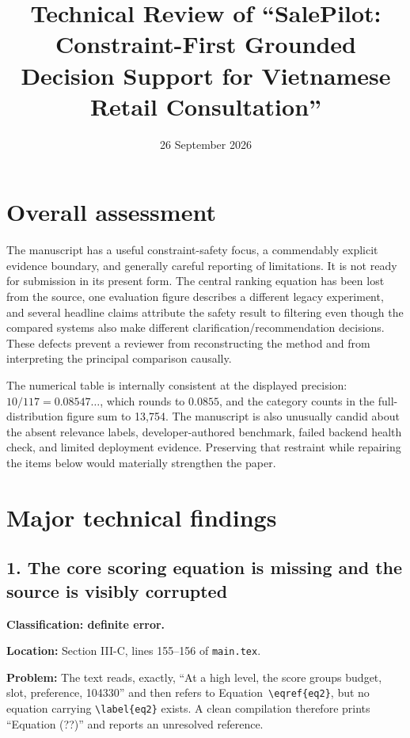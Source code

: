 \documentclass[11pt]{article}
\title{Technical Review of ``SalePilot: Constraint-First Grounded Decision Support for Vietnamese Retail Consultation''}
\author{}
\date{26 September 2026}
\begin{document}
\maketitle

\section*{Overall assessment}

The manuscript has a useful constraint-safety focus, a commendably explicit evidence boundary, and generally careful reporting of limitations.  It is not ready for submission in its present form.  The central ranking equation has been lost from the source, one evaluation figure describes a different legacy experiment, and several headline claims attribute the safety result to filtering even though the compared systems also make different clarification/recommendation decisions.  These defects prevent a reviewer from reconstructing the method and from interpreting the principal comparison causally.

The numerical table is internally consistent at the displayed precision: $10/117=0.08547\ldots$, which rounds to $0.0855$, and the category counts in the full-distribution figure sum to 13{,}754.  The manuscript is also unusually candid about the absent relevance labels, developer-authored benchmark, failed backend health check, and limited deployment evidence.  Preserving that restraint while repairing the items below would materially strengthen the paper.

\section*{Major technical findings}

\subsection*{1. The core scoring equation is missing and the source is visibly corrupted}

\textbf{Classification: definite error.}

\textbf{Location:} Section III-C, lines 155--156 of \texttt{main.tex}.

\textbf{Problem:} The text reads, exactly, ``At a high level, the score groups budget, slot, preference, 104330'' and then refers to Equation~\texttt{\textbackslash eqref\{eq2\}}, but no equation carrying \texttt{\textbackslash label\{eq2\}} exists.  A clean compilation therefore prints ``Equation (??)'' and reports an unresolved reference.
\end{document}

